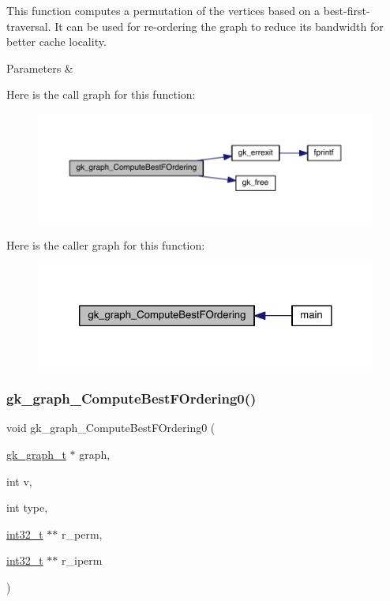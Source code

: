 This function computes a permutation of the vertices based on a best-\/first-\/traversal. It can be used for re-\/ordering the graph to reduce its bandwidth for better cache locality.


\begin{DoxyParams}{Parameters}
{\em } & \\
\hline
\end{DoxyParams}
Here is the call graph for this function\+:\nopagebreak
\begin{figure}[H]
\begin{center}
\leavevmode
\includegraphics[width=350pt]{a00077_ab06073efcea470e57620d447548b2aca_cgraph}
\end{center}
\end{figure}
Here is the caller graph for this function\+:\nopagebreak
\begin{figure}[H]
\begin{center}
\leavevmode
\includegraphics[width=324pt]{a00077_ab06073efcea470e57620d447548b2aca_icgraph}
\end{center}
\end{figure}
\mbox{\label{a00077_a698b40792daaa90d9a47c2dcfd2c07d3}} 
\subsubsection{\texorpdfstring{gk\+\_\+graph\+\_\+\+Compute\+Best\+F\+Ordering0()}{gk\_graph\_ComputeBestFOrdering0()}}
{\footnotesize\ttfamily void gk\+\_\+graph\+\_\+\+Compute\+Best\+F\+Ordering0 (\begin{DoxyParamCaption}\item[{\hyperlink{a00638}{gk\+\_\+graph\+\_\+t} $\ast$}]{graph,  }\item[{int}]{v,  }\item[{int}]{type,  }\item[{\hyperlink{a00119_a37994e3b11c72957c6f454c6ec96d43d}{int32\+\_\+t} $\ast$$\ast$}]{r\+\_\+perm,  }\item[{\hyperlink{a00119_a37994e3b11c72957c6f454c6ec96d43d}{int32\+\_\+t} $\ast$$\ast$}]{r\+\_\+iperm }\end{DoxyParamCaption})}

